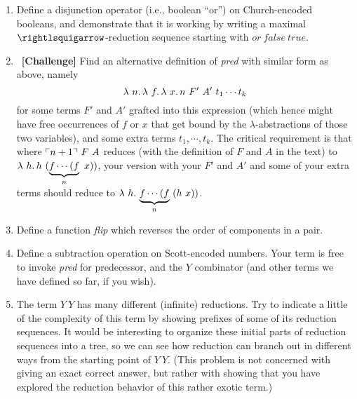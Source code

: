 \begin{enumerate}
\item Define a disjunction operator (i.e., boolean ``or'') on Church-encoded booleans, and demonstrate that it is working by writing a maximal $\betaa$-reduction sequence starting with $\textit{or}\ \textit{false}\ \textit{true}$.

\item \ \textbf{[Challenge]} Find an alternative definition of \textit{pred} with similar form as above, namely
  \[
  \lambda\ n.\, \lambda\ f.\, \lambda\ x.\, n\ F'\ A'\ t_1 \cdots t_k
  \]
  \noindent for some terms $F'$ and $A'$ grafted into this expression (which hence might have free occurrences of $f$ or $x$ that get bound by the $\lambda$-abstractions of those two variables), and some extra terms $t_1, \cdots, t_k$.
  The critical requirement is that where $\ulcorner n+1 \urcorner\ F\ A$ reduces (with the definition of $F$ and $A$ in the text) to $\lambda\ h.\, h\ (\underbrace{f \cdots (f}_n\ x))$, your version with your $F'$ and $A'$ and some of your extra terms should
  reduce to $\lam{h}{\underbrace{f \cdots (f}_n\ (h\ x))}$.

\item Define a function \textit{flip} which reverses the order of components in a pair.

\item Define a subtraction operation on Scott-encoded numbers.  Your term is free to invoke \textit{pred} for predecessor,
  and the $Y$ combinator (and other terms we have defined so far, if you wish).

  \item The term $Y\ Y$ has many different (infinite) reductions.  Try
    to indicate a little of the complexity of this term by showing
    prefixes of some of its reduction sequences.  It would be
    interesting to organize these initial parts of reduction sequences
    into a tree, so we can see how reduction can branch out in different
    ways from the starting point of $Y\ Y$.  (This problem is not concerned
    with giving an exact correct answer, but rather with showing that you
    have explored the reduction behavior of this rather exotic term.)
\end{enumerate}
